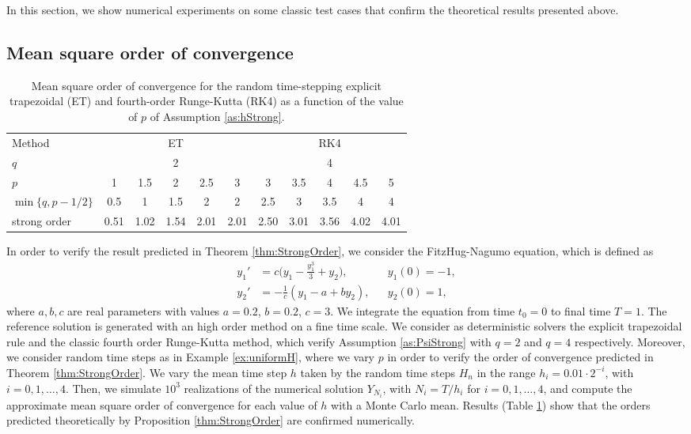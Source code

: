 \documentclass{siamart1116}
\numberwithin{theorem}{section}
\begin{document}
In this section, we show numerical experiments on some classic test cases that confirm the theoretical results presented above. 

\subsection{Mean square order of convergence}

\begin{table}[!t]
	\centering
	\begin{tabular}{l|ccccc|ccccc}
		\toprule
		Method & \multicolumn{5}{c|}{ET} & \multicolumn{5}{c}{RK4} \\ 
		\cmidrule(l{2pt}r{2pt}){2-6} \cmidrule(l{2pt}r{2pt}){7-11} 
		$q$ & \multicolumn{5}{c|}{2} & \multicolumn{5}{c}{4} \\
		$p$ & 1 & 1.5 & 2 & 2.5 & 3 & 3 & 3.5 & 4 & 4.5 & 5\\
		$\min\{q, p - 1/2\}$ & 0.5 & 1 & 1.5 & 2 & 2 & 2.5 & 3 & 3.5 & 4 & 4 \\
		strong order & 0.51 & 1.02 & 1.54 & 2.01 & 2.01 & 2.50 & 3.01 & 3.56 & 4.02 & 4.01 \\
		\bottomrule
	\end{tabular}
	\caption{Mean square order of convergence for the random time-stepping explicit trapezoidal (ET) and fourth-order Runge-Kutta (RK4) as a function of the value of $p$ of Assumption \ref{as:hStrong}.}
	\label{tab:NumericalResultsStrongOrder}
\end{table}

In order to verify the result predicted in Theorem \ref{thm:StrongOrder}, we consider the FitzHug-Nagumo equation, which is defined as
\begin{equation}\label{eq:FitzNag}
\begin{aligned}
y_1' &= c\big(y_1 - \frac{y_1^3}{3} + y_2\big), && y_1(0) = -1, \\
y_2' &= -\frac{1}{c}(y_1 - a + by_2), && y_2(0) = 1,
\end{aligned}
\end{equation}
where $a, b, c$ are real parameters with values $a = 0.2$, $b = 0.2$, $c = 3$. We integrate the equation from time $t_0 = 0$ to final time $T = 1$. The reference solution is generated with an high order method on a fine time scale. We consider as deterministic solvers the explicit trapezoidal rule and the classic fourth order Runge-Kutta method, which verify Assumption \ref{as:PsiStrong} with $q = 2$ and $q = 4$ respectively. Moreover, we consider random time steps as in Example \ref{ex:uniformH}, where we vary $p$ in order to verify the order of convergence predicted in Theorem \ref{thm:StrongOrder}. We vary the mean time step $h$ taken by the random time steps $H_n$ in the range $h_i = 0.01\cdot 2^{-i}$, with $i = 0, 1, \ldots, 4$. Then, we simulate $10^3$ realizations of the numerical solution $Y_{N_i}$, with $N_i = T / h_i$ for $i = 0, 1, \ldots, 4$, and compute the approximate mean square order of convergence for each value of $h$ with a Monte Carlo mean. Results (Table \ref{tab:NumericalResultsStrongOrder}) show that the orders predicted theoretically by Proposition \ref{thm:StrongOrder} are confirmed numerically. 
\end{document}
